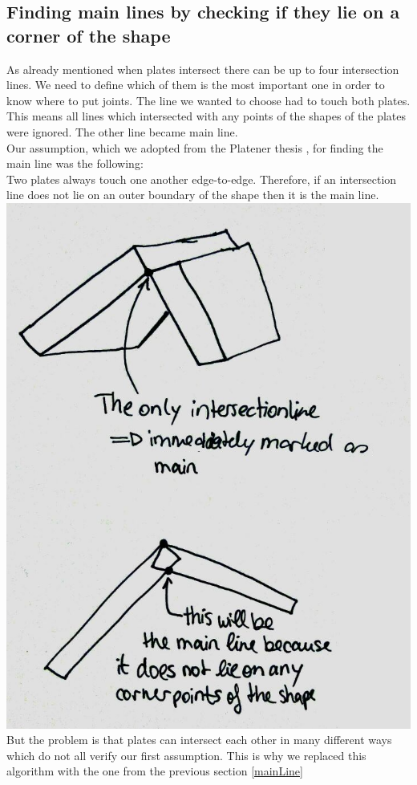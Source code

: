\documentclass[../ClassicThesis.tex]{subfiles}
\begin{document}
\subsection{Finding main lines by checking if they lie on a corner of the shape}
As already mentioned when plates intersect there can be up to four intersection lines. We need to define which of them is the most important one in order to know where to put joints. The line we wanted to choose had to touch both plates.
This means all lines which intersected with any points of the shapes of the plates were ignored. The other line became main line.\\
Our assumption, which we adopted from the Platener thesis ,  for finding the main line was the following:\\
Two plates always touch one another edge-to-edge. Therefore, if an intersection line does not lie on an outer boundary of the shape then it is the main line.\\
\includegraphics[width=.5\columnwidth]{Images/06-1-graph-assumptionMainLine.jpg}\\
But the problem is that plates can intersect each other in many different ways which do not all verify our first assumption. 
This is why we replaced this algorithm with the one from the previous section \ref{mainLine}
\end{document}

